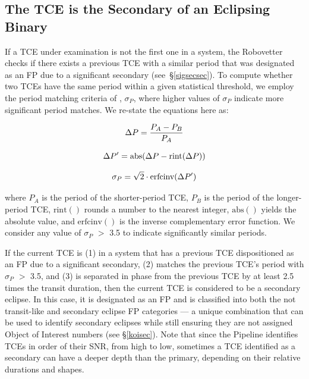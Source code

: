\subsection{The TCE is the Secondary of an Eclipsing Binary}
\label{s:issecond}
If a TCE under examination is not the first one in a system, the Robovetter checks if there exists a previous TCE with a similar period that was designated as an FP due to a significant secondary (see~\S\ref{sigsecsec}). To compute whether two TCEs have the same period within a given statistical threshold, we employ the period matching criteria of \citet[][see equations 1-3]{Coughlin2014a}, $\sigma_{P}$, where higher values of $\sigma_{P}$ indicate more significant period matches. We re-state the equations here as:

\begin{equation}
\label{peq1}
\Delta P = \frac{P_{A}-P_{B}}{P_{A}}\\
\end{equation}

\begin{equation}
\label{peq2}
\Delta P^{\prime} = \textrm{abs}(\Delta P - \textrm{rint}(\Delta P))\\
\end{equation}

\begin{equation}
\label{peq3}
\sigma_{P} = \sqrt{2}\cdot\textrm{erfcinv}(\Delta P^{\prime})\\
\end{equation}

\noindent where $P_{A}$ is the period of the shorter-period TCE, $P_{B}$ is the period of the longer-period TCE, $\mathrm{rint()}$ rounds a number to the nearest integer, $\mathrm{abs()}$ yields the absolute value, and $\mathrm{erfcinv()}$ is the inverse complementary error function. We consider any value of $\sigma_{P}$ $>$ 3.5 to indicate significantly similar periods.

If the current TCE is (1) in a system that has a previous TCE dispositioned as an FP due to a significant secondary, (2) matches the previous TCE's period with $\sigma_{P}$ $>$ 3.5, and (3) is separated in phase from the previous TCE by at least 2.5 times the transit duration, then the current TCE is considered to be a secondary eclipse. In this case, it is designated as an FP and is classified into both the not transit-like and secondary eclipse FP categories --- a unique combination that can be used to identify secondary eclipses while still ensuring they are not assigned \kepler{} Object of Interest numbers (see \S\ref{koisec}). Note that since the \kepler{} Pipeline identifies TCEs in order of their SNR, from high to low, sometimes a TCE identified as a secondary can have a deeper depth than the primary, depending on their relative durations and shapes.

